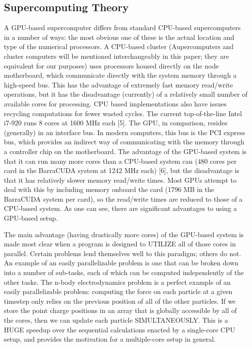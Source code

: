 \documentclass[10pt]{article}
\begin{document}
\subsection{Supercomputing Theory}
A GPU-based supercomputer differs from standard CPU-based supercomputers in a number of ways: the most obvious one of these is the actual location and type of the numerical processors. A CPU-based cluster (Aupercomputers and cluster computers will be mentioned interchangeably in this paper; they are equivalent for our purposes) uses processors housed directly on the node motherboard, which communicate directly with the system memory through a high-speed bus. This has the advantage of extremely fast memory read/write operations, but it has the disadvantage (currently) of a relatively small number of available cores for processing. CPU based implementations also have issues recycling computations for fewer wasted cycles. The current top-of-the-line Intel i7-920 runs 8 cores at 1600 MHz each [5]. The GPU, in comparison, resides (generally) in an interface bus. In modern computers, this bus is the PCI express bus, which provides an indirect way of communicating with the memory through a controller chip on the motherboard. The advantage of the GPU-based system is that it can run many more cores than a CPU-based system can (480 cores per card in the BarraCUDA system at 1242 MHz each) [6], but the disadvantage is that it has relatively slower memory read/write times. Most GPUs attempt to deal with this by including memory onboard the card (1796 MB in the BarraCUDA system per card), so the read/write times are reduced to those of a CPU-based system. As one can see, there are significant advantages to using a GPU-based setup.

The main advantage (having drastically more cores) of the GPU-based system is made most clear when a program is designed to UTILIZE all of those cores in parallel. Certain problems lend themselves well to this paradigm; others do not. An example of an easily parallelizable problem is one that can be broken down into a number of sub-tasks, each of which can be computed independently of the other tasks. The n-body electrodynamics problem is a perfect example of an easily parallelizable problem: computing the force on each particle at a given timestep only relies on the previous position of all of the other particles. If we store the point charge positions in an array that is globally accessible by all of the cores, then we can update each particle SIMULTANEOUSLY. This is a HUGE speedup over the sequential calculations enacted by a single-core CPU setup, and provides the motivation for a multiple-core setup in general.
\end{document}
